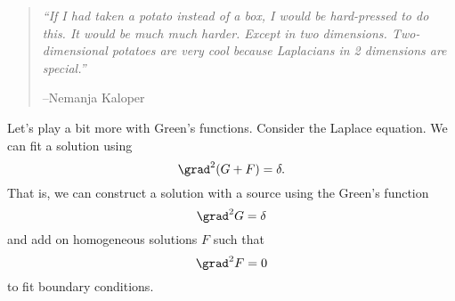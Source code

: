 \begin{quote}
    \textit{``If I had taken a potato instead of a box, I would be hard-pressed to do this. It would be much much harder. Except in two dimensions. Two-dimensional potatoes are very cool because Laplacians in 2 dimensions are special.''}
    
    --Nemanja Kaloper
\end{quote}

Let's play a bit more with Green's functions. Consider the Laplace equation. We can fit a solution using
\begin{equation}
    \grad^2(G+F) = \delta.
\end{equation}
That is, we can construct a solution with a source using the Green's function
\begin{equation}
    \grad^2 G = \delta
\end{equation}
and add on homogeneous solutions $F$ such that
\begin{equation}
    \grad^2 F =0
\end{equation}
to fit boundary conditions.

